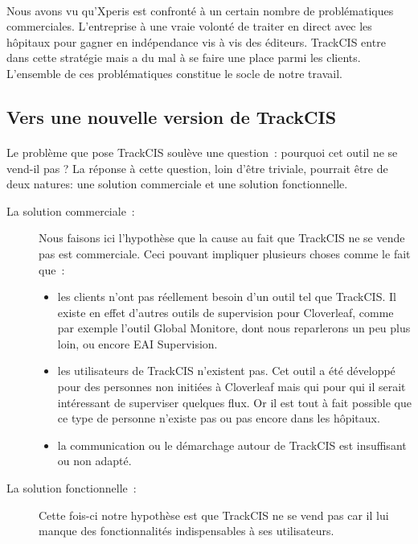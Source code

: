 	\paragraph{}
	Nous avons vu qu'Xperis est confronté à un certain nombre de problématiques
	commerciales. L'entreprise à une vraie volonté de traiter en direct avec les
	hôpitaux pour gagner en indépendance vis à vis des éditeurs. TrackCIS entre
	dans cette stratégie mais a du mal à se faire une place parmi les
	clients.\newline
	L'ensemble de ces problématiques constitue le socle de notre travail.
	
	\subsection{Vers une nouvelle version de TrackCIS}
		\paragraph{}%
		Le problème que pose TrackCIS soulève une question~: pourquoi cet outil ne se
		vend-il pas ? La réponse à cette question, loin d'être triviale, pourrait
		être de deux natures: une solution commerciale et une solution fonctionnelle.
		\begin{description}
			\item[La solution commerciale~: ] Nous faisons ici l'hypothèse que la cause
			au fait que TrackCIS ne se vende pas est commerciale. Ceci pouvant impliquer
			plusieurs choses comme le fait que~:
			\begin{itemize}
			  \item les clients n'ont pas réellement besoin d'un outil tel que TrackCIS.
			  Il existe en effet d'autres outils de supervision pour Cloverleaf, comme
			  par exemple l'outil Global Monitore, dont nous reparlerons un peu plus
			  loin, ou encore EAI Supervision.
			  \item les utilisateurs de TrackCIS n'existent pas. Cet outil a été
			  développé pour des personnes non initiées à Cloverleaf mais qui pour qui
			  il serait intéressant de superviser quelques flux.
			  Or il est tout à fait possible que ce type de personne n'existe pas ou pas
			  encore dans les hôpitaux.
			  \item la communication ou le démarchage autour de TrackCIS est insuffisant
			  ou non adapté.
			\end{itemize}
			\item[La solution fonctionnelle~: ] Cette fois-ci notre hypothèse est que
			TrackCIS ne se vend pas car il lui manque des fonctionnalités indispensables
			à ses utilisateurs.
		\end{description}
		
